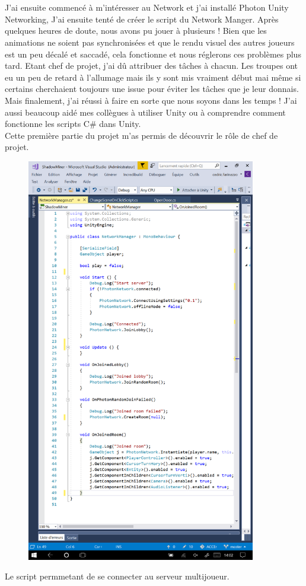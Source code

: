 \documentclass[titlepage, 13px, a4paper]{article}
\begin{document}
\paragraph{} \hspace{0pt} \\
J’ai ensuite commencé à m’intéresser au Network et j’ai installé Photon Unity Networking, 
J’ai ensuite tenté de créer le script du Network Manger. Après quelques heures de doute, 
nous avons pu jouer à plusieurs ! Bien que les animations ne soient pas synchronisées et que le rendu visuel des autres joueurs est un peu décalé et saccadé, cela fonctionne et nous réglerons ces problèmes plus tard.
Etant chef de projet, j’ai dû attribuer des tâches à chacun. 
Les troupes ont eu un peu de retard à l’allumage mais ils y sont mis vraiment début mai 
même si certains cherchaient toujours une issue pour éviter les tâches que je leur donnais.
Mais finalement, j’ai réussi à faire en sorte que nous soyons dans les temps !
J’ai aussi beaucoup aidé mes collègues à utiliser Unity ou à comprendre comment fonctionne les scripts C\# dans Unity.
\\
Cette première partie du projet m’as permis de découvrir le rôle de chef de projet.


\begin{center}
	\begin{figure}[!hp]
	   \includegraphics[width=10cm]{networkcs-game.png}
	\end{figure}
	Le script permmetant de se connecter au serveur multijoueur.
\end{center}
\end{document}
